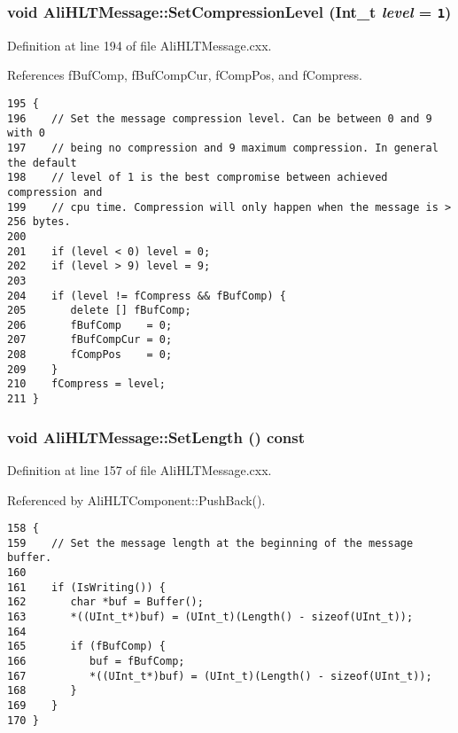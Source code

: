 \subsubsection{\setlength{\rightskip}{0pt plus 5cm}void Ali\-HLTMessage::Set\-Compression\-Level (Int\_\-t {\em level} = {\tt 1})}\label{classAliHLTMessage_a10}




Definition at line 194 of file Ali\-HLTMessage.cxx.

References f\-Buf\-Comp, f\-Buf\-Comp\-Cur, f\-Comp\-Pos, and f\-Compress.

\footnotesize\begin{verbatim}195 {
196    // Set the message compression level. Can be between 0 and 9 with 0
197    // being no compression and 9 maximum compression. In general the default
198    // level of 1 is the best compromise between achieved compression and
199    // cpu time. Compression will only happen when the message is > 256 bytes.
200 
201    if (level < 0) level = 0;
202    if (level > 9) level = 9;
203 
204    if (level != fCompress && fBufComp) {
205       delete [] fBufComp;
206       fBufComp    = 0;
207       fBufCompCur = 0;
208       fCompPos    = 0;
209    }
210    fCompress = level;
211 }
\end{verbatim}\normalsize 


\subsubsection{\setlength{\rightskip}{0pt plus 5cm}void Ali\-HLTMessage::Set\-Length () const}\label{classAliHLTMessage_a3}




Definition at line 157 of file Ali\-HLTMessage.cxx.

Referenced by Ali\-HLTComponent::Push\-Back().

\footnotesize\begin{verbatim}158 {
159    // Set the message length at the beginning of the message buffer.
160 
161    if (IsWriting()) {
162       char *buf = Buffer();
163       *((UInt_t*)buf) = (UInt_t)(Length() - sizeof(UInt_t));
164 
165       if (fBufComp) {
166          buf = fBufComp;
167          *((UInt_t*)buf) = (UInt_t)(Length() - sizeof(UInt_t));
168       }
169    }
170 }
\end{verbatim}\normalsize 


